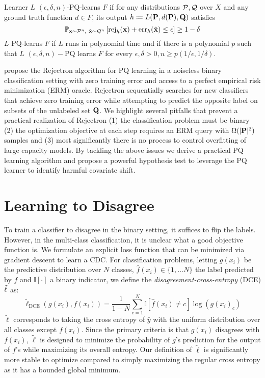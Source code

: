\begin{definition}
    Learner $L$ $(\epsilon, \delta, n)$-PQ-learns $F$ if for any distributions $\mathcal{P}, \mathcal{Q}$ over $X$ and any ground truth function $d \in F$, its output $h\coloneqq L(\mathbf{P}, d(\mathbf{P}), \mathbf{Q})$ satisfies
    \begin{equation}
        \mathbb{P}_{{\mathbf{x} \sim \Pc^{n}},\ {\tilde{\mathbf{x}} \sim \Qc^{n}}}\left[\text{rej}_h(\mathbf{x})+\operatorname{err}_h(\tilde{\mathbf{x}}) \leq \epsilon\right] \geq 1-\delta
        \label{eq:pqlearn}
    \end{equation}
    $L$ PQ-learns $F$ if $L$ runs in polynomial time and if there is a polynomial $p$ such that $L$ $(\epsilon, \delta, n)-$PQ learns $F$ for every $\epsilon, \delta>0, n \geq p(1 / \epsilon, 1 / \delta)$.
\end{definition}
\citeauthor{pqlearn} propose the Rejectron algorithm for PQ learning in a noiseless binary classification setting with zero training error and access to a perfect empirical risk minimization (ERM) oracle.
Rejectron sequentially searches for new classifiers that achieve zero training error while attempting to predict the opposite label on subsets of the unlabeled set $\mathbf{Q}$.
We highlight several pitfalls that prevent a practical realization of Rejectron (1) the classification problem must be binary (2) the optimization objective at each step requires an ERM query with $\Omega(|\mathbf{P}|^2)$ samples and (3) most significantly there is no process to control overfitting of large capacity models.
By tackling the above issues we derive a practical PQ learning algorithm and propose a powerful hypothesis test to leverage the PQ learner to identify harmful covariate shift.


\section{Learning to Disagree}\label{sec:dis}
To train a classifier to disagree in the binary setting, it suffices to flip the labels.
However, in the multi-class classification, it is unclear what a good objective function is.
We formulate an explicit loss function that can be minimized via gradient descent to learn a CDC.
For classification problems, letting $g(x_i)$ be the predictive distribution over $N$ classes, $\hat{f}(x_i)\in \{1,\dots N\}$
the label predicted by $f$ and $\mathbb{I}[\cdot ]$ a binary indicator, we define the \textit{disagreement-cross-entropy} (DCE) $\small \tilde{\ell}$ as:
\begin{equation}
    \tilde{\ell}_{\text{DCE}}(g(x_i), f(x_i)) =  \frac{1}{1-N} \sum_{c=1}^N \mathbb{I}[{\hat{f}(x_i) \neq c}] \log(g(x_i)_c)
    \label{eq:anitcross}
\end{equation}
$\tilde{\ell}$ corresponds to taking the cross entropy of $\hat{y}$ with the uniform distribution over all classes except $f(x_i)$.
Since the primary criteria is that $g(x_i)$ disagrees with $f(x_i)$, $\tilde{\ell}$ is designed to minimize the probability of $g$'s prediction for the output of $f$'s while maximizing its overall entropy.
Our definition of $\tilde{\ell}$ is significantly more stable to optimize compared to simply maximizing the regular cross entropy as it has a bounded global minimum.

